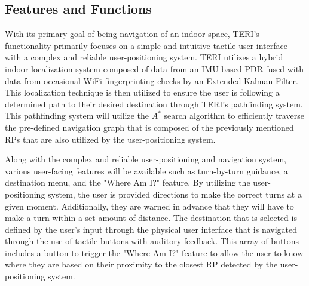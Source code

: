 \documentclass{article}
\begin{document}
\subsection{Features and Functions}
With its primary goal of being navigation of an indoor space, TERI's functionality primarily focuses on a simple and intuitive tactile user interface with a complex and reliable user-positioning system. TERI utilizes a hybrid indoor localization system composed of data from an IMU-based PDR fused with data from occasional WiFi fingerprinting checks by an Extended Kalman Filter. This localization technique is then utilized to ensure the user is following a determined path to their desired destination through TERI's pathfinding system. This pathfinding system will utilize the $A^*$ search algorithm to efficiently traverse the pre-defined navigation graph that is composed of the previously mentioned RPs that are also utilized by the user-positioning system.

Along with the complex and reliable user-positioning and navigation system, various user-facing features will be available such as turn-by-turn guidance, a destination menu, and the "Where Am I?" feature. By utilizing the user-positioning system, the user is provided directions to make the correct turns at a given moment. Additionally, they are warned in advance that they will have to make a turn within a set amount of distance. The destination that is selected is defined by the user's input through the physical user interface that is navigated through the use of tactile buttons with auditory feedback. This array of buttons includes a button to trigger the "Where Am I?" feature to allow the user to know where they are based on their proximity to the closest RP detected by the user-positioning system.
\end{document}
